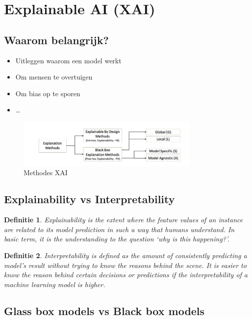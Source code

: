 \documentclass{article}
\newtheorem{theorem}{Definitie}[section]
\begin{document}
\section{Explainable AI (XAI)}

\subsection{Waarom belangrijk?}

\begin{itemize}
    \item Uitleggen waarom een model werkt 
    \item Om mensen te overtuigen
    \item Om bias op te sporen
    \item \dots
\end{itemize}

\begin{figure}[H]
    \centering
    \includegraphics[width=0.8\textwidth]{explainable-ai.png}
    \caption{Methodes XAI}
\end{figure}

\subsection{Explainability vs Interpretability}

\begin{theorem}
    Explainability is the extent where the feature values of an instance are related to
    its model prediction in such a way that humans understand. In basic term, it is
    the understanding to the question `why is this happening?'.
\end{theorem}

\begin{theorem}
    Interpretability is defined as the amount of consistently predicting a model's
    result without trying to know the reasons behind the scene. It is easier to know
    the reason behind certain decisions or predictions if the interpretability of
    a machine learning model is higher.
\end{theorem}

\subsection{Glass box models vs Black box models}
\end{document}
